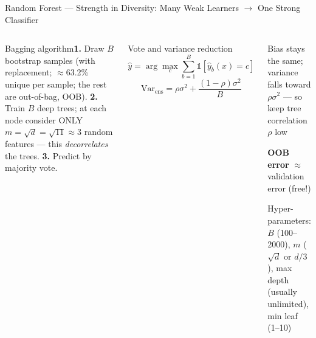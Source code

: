 \documentclass[aspectratio=169,10pt,t]{beamer}
\begin{document}
\begin{frame}{Random Forest --- Strength in Diversity: Many Weak Learners $\to$ One Strong Classifier}
\begin{columns}[T]
\begin{cbox}{Bagging algorithm}\scriptsize \textbf{1.} Draw $B$ bootstrap samples (with replacement; $\approx$63.2\% unique per sample; the rest are out-of-bag, OOB). \textbf{2.} Train $B$ deep trees; at each node consider ONLY $m=\sqrt d=\sqrt{11}\approx3$ random features --- this \emph{decorrelates} the trees. \textbf{3.} Predict by majority vote.\end{cbox}
\begin{fbx}{Vote and variance reduction}\[\hat y=\arg\max_c\sum_{b=1}^{B}\mathbb{1}[\hat y_b(x)=c]\]\[\text{Var}_{\text{ens}}=\rho\sigma^{2}+\frac{(1-\rho)\sigma^{2}}{B}\]\end{fbx}
\begin{tl}\item Bias stays the same; variance falls toward $\rho\sigma^2$ --- so keep tree correlation $\rho$ low\item \textbf{OOB error} $\approx$ validation error (free!)\item Hyper-parameters: $B$ (100--2000), $m$ ($\sqrt d$ or $d/3$), max depth (usually unlimited), min leaf (1--10)\end{tl}
\end{columns}
\end{frame}
\end{document}
